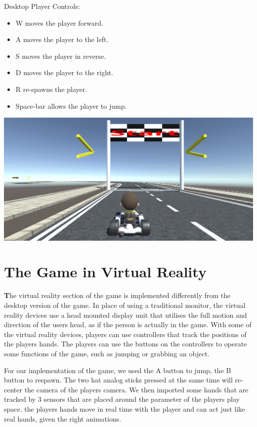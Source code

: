 Desktop Player Controls:
\begin{itemize}
\item W moves the player forward.
\item A moves the player to the left.
\item S moves the player in reverse.
\item D moves the player to the right.
\item R re-spawns the player.
\item Space-bar allows the player to jump. 
\end{itemize}
\includegraphics[width=1\columnwidth]{img/GameActual.PNG}

\section{The Game in Virtual Reality}

\textbf
The virtual reality section of the game is implemented differently from the desktop version of the game. In place of using a traditional monitor, the virtual reality devices use a head mounted display unit that utilises the full motion and direction of the users head, as if the person is actually in the game. With some of the virtual reality devices, players can use controllers that track the positions of the players hands. The players can use the buttons on the controllers to operate some functions of the game, such as jumping or grabbing an object.\newline

For our implementation of the game, we used the A button to jump, the B button to respawn. The two hat analog sticks pressed at the same time will re-center the camera of the players camera. We then imported some hands that are tracked by 3 sensors that are placed around the parameter of the players play space. the players hands move in real time with the player and can act just like real hands, given the right animations.\newline 

